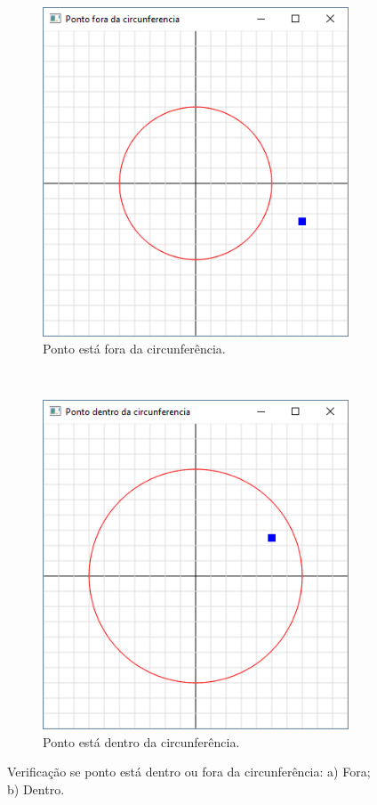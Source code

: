 \begin{renumerate}
   \begin{figure}[!htb]
    \centering
    \begin{subfigure}[t]{0.3\textwidth}
        \centerline{\includegraphics[width=.9\textwidth]{img/cap1_ex22}}
        \caption{Ponto está fora da circunferência.}
        \label{fig:cap01_ex22a}
    \end{subfigure}
    ~
    \begin{subfigure}[t]{0.3\textwidth}
        \centerline{\includegraphics[width=.9\textwidth]{img/cap1_ex22b}}
        \caption{Ponto está dentro da circunferência.}
        \label{fig:cap01_ex22b}
    \end{subfigure}
    \caption{Verificação se ponto está dentro ou fora da circunferência: a) Fora; b) Dentro.}
  \end{figure}


\end{renumerate}

